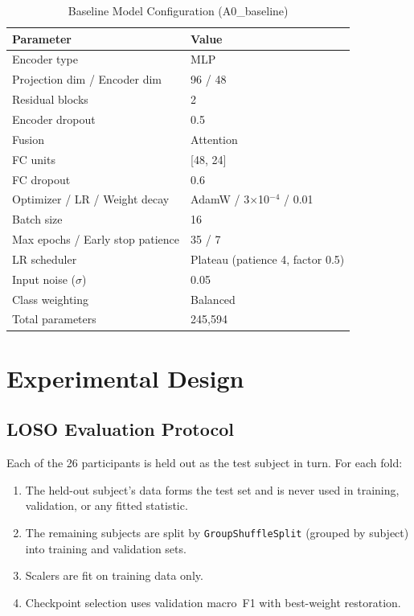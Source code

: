 \documentclass[conference]{IEEEtran}
\begin{document}
\begin{table}[t]
\centering
\caption{Baseline Model Configuration (A0\_baseline)}
\label{tab:baseline_config}
\begin{tabular}{ll}
\toprule
\textbf{Parameter} & \textbf{Value} \\
\midrule
Encoder type & MLP \\
Projection dim / Encoder dim & 96 / 48 \\
Residual blocks & 2 \\
Encoder dropout & 0.5 \\
Fusion & Attention \\
FC units & [48, 24] \\
FC dropout & 0.6 \\
Optimizer / LR / Weight decay & AdamW / 3$\times$10$^{-4}$ / 0.01 \\
Batch size & 16 \\
Max epochs / Early stop patience & 35 / 7 \\
LR scheduler & Plateau (patience 4, factor 0.5) \\
Input noise ($\sigma$) & 0.05 \\
Class weighting & Balanced \\
Total parameters & 245{,}594 \\
\bottomrule
\end{tabular}
\end{table}

\section{Experimental Design}

\subsection{LOSO Evaluation Protocol}
Each of the 26 participants is held out as the test subject in turn. For each fold:
\begin{enumerate}
    \item The held-out subject's data forms the test set and is never used in training, validation, or any fitted statistic.
    \item The remaining subjects are split by \texttt{GroupShuffleSplit} (grouped by subject) into training and validation sets.
    \item Scalers are fit on training data only.
    \item Checkpoint selection uses validation macro~F1 with best-weight restoration.
\end{enumerate}
\end{document}
